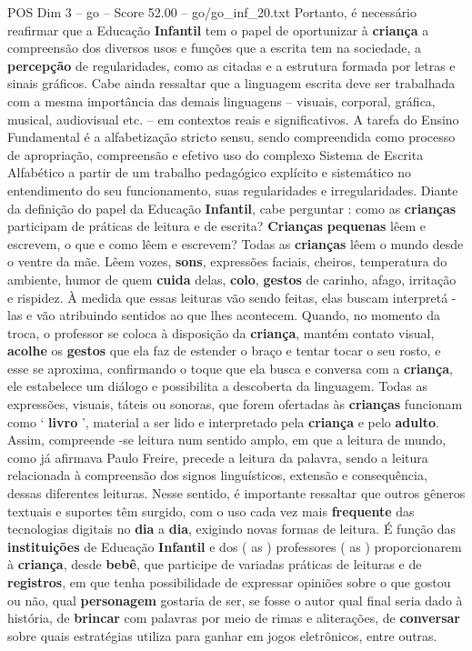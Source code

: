 \begin{textsample}{POS Dim 3 – go – Score 52.00 – go/go\_inf\_20.txt}
Portanto, é necessário reafirmar que a Educação \textbf{Infantil} tem o papel de oportunizar à \textbf{criança} a compreensão dos diversos usos e funções que a escrita tem na sociedade, a \textbf{percepção} de regularidades, como as citadas e a estrutura formada por letras e sinais gráficos.
Cabe ainda ressaltar que a linguagem escrita deve ser trabalhada com a mesma importância das demais linguagens – visuais, corporal, gráfica, musical, audiovisual etc. – em contextos reais e significativos.
A tarefa do Ensino Fundamental é a alfabetização stricto sensu, sendo compreendida como processo de apropriação, compreensão e efetivo uso do complexo Sistema de Escrita Alfabético a partir de um trabalho pedagógico explícito e sistemático no entendimento do seu funcionamento, suas regularidades e irregularidades.
Diante da definição do papel da Educação \textbf{Infantil}, cabe perguntar : como as \textbf{crianças} participam de práticas de leitura e de escrita? \textbf{Crianças} \textbf{pequenas} lêem e escrevem, o que e como lêem e escrevem?
Todas as \textbf{crianças} lêem o mundo desde o ventre da mãe.
Lêem vozes, \textbf{sons}, expressões faciais, cheiros, temperatura do ambiente, humor de quem \textbf{cuida} delas, \textbf{colo}, \textbf{gestos} de carinho, afago, irritação e rispidez.
À medida que essas leituras vão sendo feitas, elas buscam interpretá -las e vão atribuindo sentidos ao que lhes acontecem.
Quando, no momento da troca, o professor se coloca à disposição da \textbf{criança}, mantém contato visual, \textbf{acolhe} os \textbf{gestos} que ela faz de estender o braço e tentar tocar o seu rosto, e esse se aproxima, confirmando o toque que ela busca e conversa com a \textbf{criança}, ele estabelece um diálogo e possibilita a descoberta da linguagem.
Todas as expressões, visuais, táteis ou sonoras, que forem ofertadas às \textbf{crianças} funcionam como ‘ \textbf{livro} ’, material a ser lido e interpretado pela \textbf{criança} e pelo \textbf{adulto}.
Assim, compreende -se leitura num sentido amplo, em que a leitura de mundo, como já afirmava Paulo Freire, precede a leitura da palavra, sendo a leitura relacionada à compreensão dos signos linguísticos, extensão e consequência, dessas diferentes leituras.
Nesse sentido, é importante ressaltar que outros gêneros textuais e suportes têm surgido, com o uso cada vez mais \textbf{frequente} das tecnologias digitais no \textbf{dia} a \textbf{dia}, exigindo novas formas de leitura.
É função das \textbf{instituições} de Educação \textbf{Infantil} e dos ( as ) professores ( as ) proporcionarem à \textbf{criança}, desde \textbf{bebê}, que participe de variadas práticas de leituras e de \textbf{registros}, em que tenha possibilidade de expressar opiniões sobre o que gostou ou não, qual \textbf{personagem} gostaria de ser, se fosse o autor qual final seria dado à história, de \textbf{brincar} com palavras por meio de rimas e aliterações, de \textbf{conversar} sobre quais estratégias utiliza para ganhar em jogos eletrônicos, entre outras.

\end{textsample}
